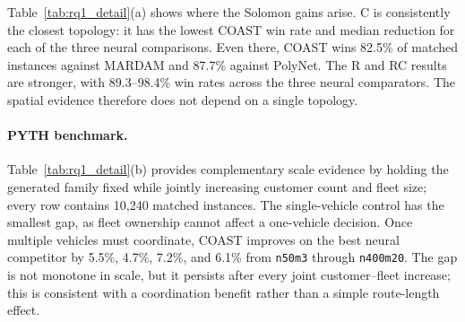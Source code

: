 \documentclass[letterpaper]{article}
\begin{document}
Table~\ref{tab:rq1_detail}(a) shows where the Solomon gains arise. C is consistently the closest topology: it has the lowest COAST win rate and median reduction for each of the three neural comparisons. Even there, COAST wins 82.5\% of matched instances against MARDAM and 87.7\% against PolyNet. The R and RC results are stronger, with 89.3--98.4\% win rates across the three neural comparators. The spatial evidence therefore does not depend on a single topology.

\paragraph{PYTH benchmark.} Table~\ref{tab:rq1_detail}(b) provides complementary scale evidence by holding the generated family fixed while jointly increasing customer count and fleet size; every row contains 10,240 matched instances. The single-vehicle control has the smallest gap, as fleet ownership cannot affect a one-vehicle decision. Once multiple vehicles must coordinate, COAST improves on the best neural competitor by 5.5\%, 4.7\%, 7.2\%, and 6.1\% from \texttt{n50m3} through \texttt{n400m20}. The gap is not monotone in scale, but it persists after every joint customer--fleet increase; this is consistent with a coordination benefit rather than a simple route-length effect.
\end{document}
